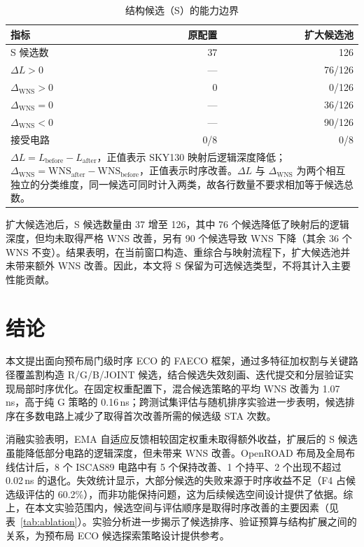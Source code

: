 \documentclass[twocolumn,10pt,fontset=windows]{ctexart}
\begin{document}
\begin{table}[H]
\centering
\caption{结构候选（S）的能力边界}
\label{tab:s_boundary}
\footnotesize
\setlength{\tabcolsep}{8pt}
\begin{tabular}{lrr}
\toprule
\textbf{指标} & \textbf{原配置} & \textbf{扩大候选池} \\
\midrule
S 候选数 & 37 & 126 \\
$\Delta L>0$ & — & 76/126 \\
$\Delta_{\mathrm{WNS}}>0$ & 0 & 0/126 \\
$\Delta_{\mathrm{WNS}}=0$ & — & 36/126 \\
$\Delta_{\mathrm{WNS}}<0$ & — & 90/126 \\
接受电路 & 0/8 & 0/8 \\
\bottomrule
\multicolumn{3}{p{0.9\columnwidth}}{\footnotesize $\Delta L=L_{\mathrm{before}}-L_{\mathrm{after}}$，正值表示 SKY130 映射后逻辑深度降低；$\Delta_{\mathrm{WNS}}=\mathrm{WNS}_{\mathrm{after}}-\mathrm{WNS}_{\mathrm{before}}$，正值表示时序改善。$\Delta L$ 与 $\Delta_{\mathrm{WNS}}$ 为两个相互独立的分类维度，同一候选可同时计入两类，故各行数量不要求相加等于候选总数。}\\
\end{tabular}
\end{table}

扩大候选池后，S 候选数量由 37 增至 126，其中 76 个候选降低了映射后的逻辑深度，但均未取得严格 WNS 改善，另有 90 个候选导致 WNS 下降（其余 36 个 WNS 不变）。结果表明，在当前窗口构造、重综合与映射流程下，扩大候选池并未带来额外 WNS 改善。因此，本文将 S 保留为可选候选类型，不将其计入主要性能贡献。

\section{结论}\label{sec:conclusion}

本文提出面向预布局门级时序 ECO 的 FAECO 框架，通过多特征加权割与关键路径覆盖割构造 R/G/B/JOINT 候选，结合候选失效刻画、迭代提交和分层验证实现局部时序优化。在固定权重配置下，混合候选策略的平均 WNS 改善为 1.07\,ns，高于纯 G 策略的 0.16\,ns；跨测试集评估与随机排序实验进一步表明，候选排序在多数电路上减少了取得首次改善所需的候选级 STA 次数。

消融实验表明，EMA 自适应反馈相较固定权重未取得额外收益，扩展后的 S 候选虽能降低部分电路的逻辑深度，但未带来 WNS 改善。OpenROAD 布局及全局布线估计后，8 个 ISCAS89 电路中有 5 个保持改善、1 个持平、2 个出现不超过 0.02\,ns 的退化。失效统计显示，大部分候选的失败来源于时序收益不足（F4 占候选级评估的 60.2\%），而非功能保持问题，这为后续候选空间设计提供了依据。综上，在本文实验范围内，候选空间与评估顺序是取得时序改善的主要因素（见表~\ref{tab:ablation}）。实验分析进一步揭示了候选排序、验证预算与结构扩展之间的关系，为预布局 ECO 候选探索策略设计提供参考。
\end{document}
